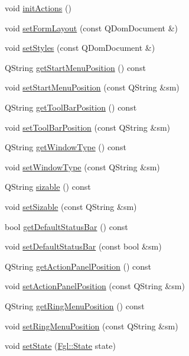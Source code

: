 \begin{DoxyCompactItemize}
void \hyperlink{classFglForm_af5e8206054e3275e2977056e685b73da}{initActions} ()
\item 
void \hyperlink{classFglForm_a6a923c50e859e58d34046d0b0f86c11d}{setFormLayout} (const QDomDocument \&)
\item 
void \hyperlink{classFglForm_a07c0926396e4229b40de7988689a1f16}{setStyles} (const QDomDocument \&)
\item 
QString \hyperlink{classFglForm_a40002405b99f9291e8f61944a775172a}{getStartMenuPosition} () const 
\item 
void \hyperlink{classFglForm_a2badc0486f40c57306fdefe14800a13b}{setStartMenuPosition} (const QString \&sm)
\item 
QString \hyperlink{classFglForm_ac138a537d43b85e677818e1a61f3cd3d}{getToolBarPosition} () const 
\item 
void \hyperlink{classFglForm_af3b00991b1e002fe156d0298468a2311}{setToolBarPosition} (const QString \&sm)
\item 
QString \hyperlink{classFglForm_a1e47b1b987a50ed9e4155bdf0664feba}{getWindowType} () const 
\item 
void \hyperlink{classFglForm_ad780eff8bf0437a8e33a9115885718e9}{setWindowType} (const QString \&sm)
\item 
QString \hyperlink{classFglForm_a714fbe1dca04c76d368a8a429b6322c1}{sizable} () const 
\item 
void \hyperlink{classFglForm_a805e33b8b74b0cc73dad05eac238f9db}{setSizable} (const QString \&sm)
\item 
bool \hyperlink{classFglForm_a9cacfea35fa0152d42b399fc6d2a2524}{getDefaultStatusBar} () const 
\item 
void \hyperlink{classFglForm_a4b2f8754ef3aa90fc46d04c2020ed5af}{setDefaultStatusBar} (const bool \&sm)
\item 
QString \hyperlink{classFglForm_a1d53398b0bf7a81f7d6f4fab65faa3dd}{getActionPanelPosition} () const 
\item 
void \hyperlink{classFglForm_a80b78ad88d0dc22b7f4df7a724794a13}{setActionPanelPosition} (const QString \&sm)
\item 
QString \hyperlink{classFglForm_a773cd80cab1ae1efaccc48262b2cbc55}{getRingMenuPosition} () const 
\item 
void \hyperlink{classFglForm_af25c944e246c0522cd333e452ead9cad}{setRingMenuPosition} (const QString \&sm)
\item 
void \hyperlink{classFglForm_a5f6285fdf157e863c68402ec8147c53a}{setState} (\hyperlink{namespaceFgl_a66700792cb225549384ae76c1057cf22}{Fgl::State} state)

\end{DoxyCompactItemize}
